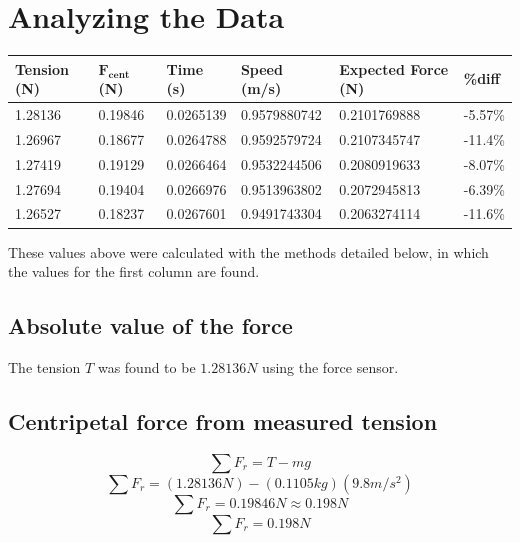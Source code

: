 \documentclass[11pt, letterpaper, includehead]{article}
\begin{document}
\section{Analyzing the Data}
\begin{center} 
  \begin{tabular}{|m{2.3cm}| m{1.7cm} | m{1.7cm} | m{2.4cm} | m{3.8cm} | m{1.2cm} |} 
    \hline
    \textbf{Tension (N)} & $\mathbf{F_{cent}}$ \textbf{(N)} & \textbf{Time (s)} & \textbf{Speed (m/s)} & \textbf{Expected Force (N)} & \textbf{\%diff}\\ 
    \hline
    1.28136 & 0.19846 & 0.0265139 & 0.9579880742 & 0.2101769888 & -5.57\%\\ 
    \hline
    1.26967 & 0.18677 & 0.0264788 & 0.9592579724 & 0.2107345747 & -11.4\%\\ 
    \hline
    1.27419 & 0.19129 & 0.0266464 & 0.9532244506 & 0.2080919633 & -8.07\%\\ 
    \hline
    1.27694 & 0.19404 & 0.0266976 & 0.9513963802 & 0.2072945813 & -6.39\%\\ 
    \hline
    1.26527 & 0.18237 & 0.0267601 & 0.9491743304 & 0.2063274114 & -11.6\%\\ 
    \hline
  \end{tabular} 
\end{center}
These values above were calculated with the methods detailed below, in which the values for the first column are found.
\subsection{Absolute value of the force}
The tension $T$ was found to be $1.28136N$ using the force sensor.

\subsection{Centripetal force from measured tension}
\begin{center}
\end{center}
$$\sum F_r = T - mg$$
$$\sum F_r = (1.28136N) - (0.1105 kg)(9.8 m/s^2)$$
$$\sum F_r = 0.19846N \approx 0.198N$$
$$\boxed{\sum F_r = 0.198N}$$
\end{document}
